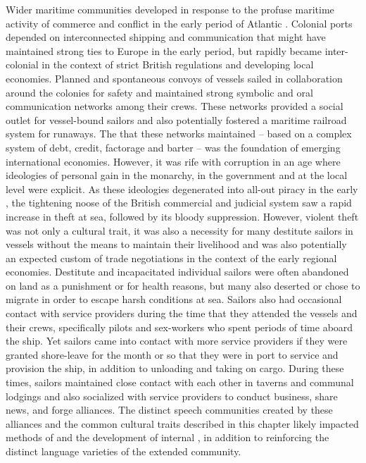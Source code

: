 Wider maritime communities developed in response to the profuse maritime activity of commerce and conflict in the early period of Atlantic . Colonial ports depended on interconnected shipping and communication that might have maintained strong ties to Europe in the early period, but rapidly became inter-colonial in the context of strict British regulations and developing local economies. Planned and spontaneous convoys of vessels sailed in collaboration around the colonies for safety and maintained strong symbolic and oral communication networks among their crews. These networks provided a social outlet for vessel-bound sailors and also potentially fostered a maritime railroad system for runaways. The  that these networks maintained –  based on a complex system of debt, credit, factorage and barter –  was the foundation of emerging international economies. However, it was rife with corruption in an age where ideologies of personal gain in the monarchy, in the government and at the local level were explicit. As these ideologies degenerated into all-out piracy in the early , the tightening noose of the British commercial and judicial system saw a rapid increase in theft at sea, followed by its bloody suppression. However, violent theft was not only a cultural trait, it was also a necessity for many destitute sailors in vessels without the means to maintain their livelihood and was also potentially an expected custom of trade negotiations in the context of the early regional economies. Destitute and incapacitated individual sailors were often abandoned on land as a punishment or for health reasons, but many also deserted or chose to migrate in order to escape harsh conditions at sea. Sailors also had occasional contact with service providers during the time that they attended the vessels and their crews, specifically pilots and sex-workers who spent periods of time aboard the ship. Yet sailors came into contact with more service providers if they were granted shore-leave for the month or so that they were in port to service and provision the ship, in addition to unloading and taking on cargo. During these times, sailors maintained close contact with each other in taverns and communal lodgings and also socialized with service providers to conduct business, share news, and forge alliances. The distinct speech communities created by these alliances and the common cultural traits described in this chapter likely impacted methods of  and the development of internal , in addition to reinforcing the distinct language varieties of the extended  community. 

